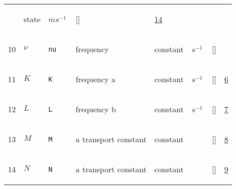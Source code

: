\begin{longtable}{|p{1cm}|p{3cm}|p{3cm}|p{7cm}|p{3.0cm}|p{3cm}|p{2cm}|p{1cm}|}
             & \begin{lay}state \end{lay}
             & $ m s^{-1} \, $
             & []
             & \hyperlink{"e:14"}{ 14 }
                 \\
    10
             & \hypertarget{"v:10"}{ $ {\nu}{_{}} $}
             & \verb|nu|
             & frequency
             & \begin{lay}constant \end{lay}
             & $ s^{-1} \, $
             & []
             & \\
    11
             & \hypertarget{"v:11"}{ $ {K}{_{}} $}
             & \verb|K|
             & frequency a
             & \begin{lay}constant \end{lay}
             & $ s^{-1} \, $
             & []
             & \hyperlink{"e:6"}{ 6 }
                 \\
    12
             & \hypertarget{"v:12"}{ $ {L}{_{}} $}
             & \verb|L|
             & frequency b
             & \begin{lay}constant \end{lay}
             & $ s^{-1} \, $
             & []
             & \hyperlink{"e:7"}{ 7 }
                 \\
    13
             & \hypertarget{"v:13"}{ $ {M}{_{}} $}
             & \verb|M|
             & a transport constant
             & \begin{lay}constant \end{lay}
             & $  $
             & []
             & \hyperlink{"e:8"}{ 8 }
                 \\
    14
             & \hypertarget{"v:14"}{ $ {N}{_{}} $}
             & \verb|N|
             & a transport constant
             & \begin{lay}constant \end{lay}
             & $  $
             & []
             & \hyperlink{"e:9"}{ 9 }
                 \\
    \end{longtable}